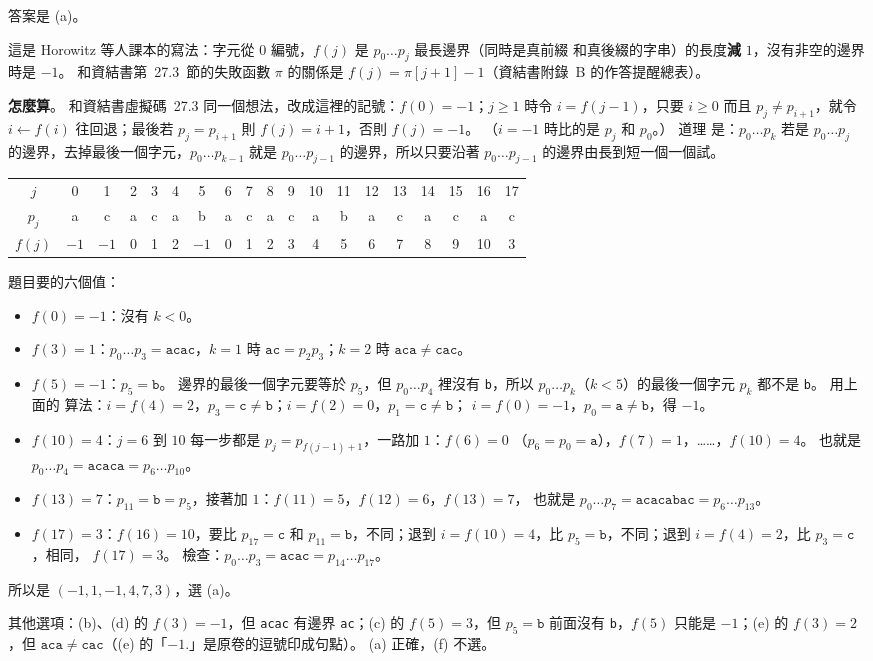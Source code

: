 \begin{pastsoln}
答案是 (a)。

這是 Horowitz 等人課本的寫法：字元從 $0$ 編號，$f(j)$ 是 $p_0 \ldots p_j$ 最長邊界（同時是真前綴
和真後綴的字串）的長度\textbf{減} $1$，沒有非空的邊界時是 $-1$。 和資結書第~27.3~節的失敗函數
$\pi$ 的關係是 $f(j) = \pi[j + 1] - 1$（資結書附錄~B 的作答提醒總表）。

\textbf{怎麼算}。 和資結書虛擬碼~27.3 同一個想法，改成這裡的記號：$f(0) = -1$；$j \ge 1$ 時令
$i = f(j - 1)$，只要 $i \ge 0$ 而且 $p_j \ne p_{i+1}$，就令 $i \gets f(i)$ 往回退；最後若
$p_j = p_{i+1}$ 則 $f(j) = i + 1$，否則 $f(j) = -1$。 （$i = -1$ 時比的是 $p_j$ 和 $p_0$。） 道理
是：$p_0 \ldots p_k$ 若是 $p_0 \ldots p_j$ 的邊界，去掉最後一個字元，$p_0 \ldots p_{k-1}$ 就是
$p_0 \ldots p_{j-1}$ 的邊界，所以只要沿著 $p_0 \ldots p_{j-1}$ 的邊界由長到短一個一個試。

\begin{center}
\small
\setlength{\tabcolsep}{3.2pt}
\begin{tabular}{c*{18}{c}}
\toprule
$j$ & 0 & 1 & 2 & 3 & 4 & 5 & 6 & 7 & 8 & 9 & 10 & 11 & 12 & 13 & 14 & 15 & 16 & 17 \\
$p_j$ & a & c & a & c & a & b & a & c & a & c & a & b & a & c & a & c & a & c \\
$f(j)$ & $-1$ & $-1$ & 0 & 1 & 2 & $-1$ & 0 & 1 & 2 & 3 & 4 & 5 & 6 & 7 & 8 & 9 & 10 & 3 \\
\bottomrule
\end{tabular}
\end{center}

題目要的六個值：
\begin{itemize}
\item $f(0) = -1$：沒有 $k < 0$。
\item $f(3) = 1$：$p_0 \ldots p_3 = \mathtt{acac}$，$k = 1$ 時 $\mathtt{ac} = p_2 p_3$；$k = 2$ 時
$\mathtt{aca} \ne \mathtt{cac}$。
\item $f(5) = -1$：$p_5 = \mathtt{b}$。 邊界的最後一個字元要等於 $p_5$，但 $p_0 \ldots p_4$ 裡沒有
\texttt{b}，所以 $p_0 \ldots p_k$（$k < 5$）的最後一個字元 $p_k$ 都不是 \texttt{b}。 用上面的
算法：$i = f(4) = 2$，$p_3 = \mathtt{c} \ne \mathtt{b}$；$i = f(2) = 0$，$p_1 = \mathtt{c} \ne \mathtt{b}$；
$i = f(0) = -1$，$p_0 = \mathtt{a} \ne \mathtt{b}$，得 $-1$。
\item $f(10) = 4$：$j = 6$ 到 $10$ 每一步都是 $p_j = p_{f(j-1)+1}$，一路加 $1$：$f(6) = 0$
（$p_6 = p_0 = \mathtt{a}$），$f(7) = 1$，……，$f(10) = 4$。 也就是 $p_0 \ldots p_4 = \mathtt{acaca}
= p_6 \ldots p_{10}$。
\item $f(13) = 7$：$p_{11} = \mathtt{b} = p_5$，接著加 $1$：$f(11) = 5$，$f(12) = 6$，$f(13) = 7$，
也就是 $p_0 \ldots p_7 = \mathtt{acacabac} = p_6 \ldots p_{13}$。
\item $f(17) = 3$：$f(16) = 10$，要比 $p_{17} = \mathtt{c}$ 和 $p_{11} = \mathtt{b}$，不同；退到
$i = f(10) = 4$，比 $p_5 = \mathtt{b}$，不同；退到 $i = f(4) = 2$，比 $p_3 = \mathtt{c}$，相同，
$f(17) = 3$。 檢查：$p_0 \ldots p_3 = \mathtt{acac} = p_{14} \ldots p_{17}$。
\end{itemize}
所以是 $(-1, 1, -1, 4, 7, 3)$，選 (a)。

其他選項：(b)、(d) 的 $f(3) = -1$，但 \texttt{acac} 有邊界 \texttt{ac}；(c) 的 $f(5) = 3$，但
$p_5 = \mathtt{b}$ 前面沒有 \texttt{b}，$f(5)$ 只能是 $-1$；(e) 的 $f(3) = 2$，但
$\mathtt{aca} \ne \mathtt{cac}$（(e) 的「$-1.$」是原卷的逗號印成句點）。 (a) 正確，(f) 不選。
\end{pastsoln}

